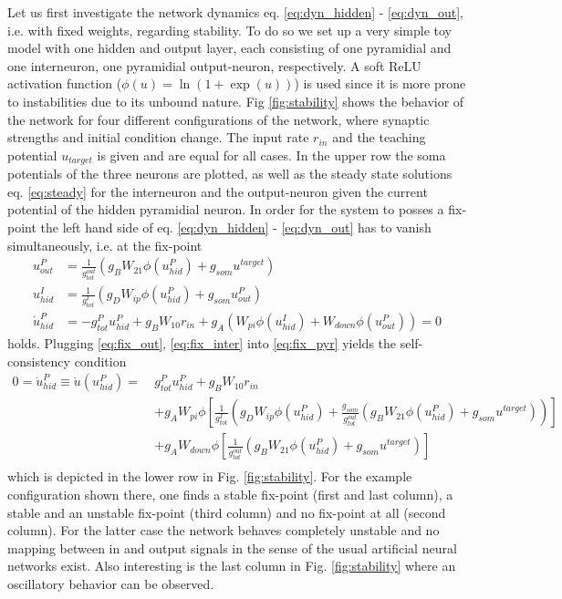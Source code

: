 \documentclass[12pt,a4paper]{article}
\begin{document}
Let us first investigate the network dynamics eq. \eqref{eq:dyn_hidden} - \eqref{eq:dyn_out}, i.e. with fixed weights, regarding stability. To do so we set up a very simple toy model with one hidden and output layer, each consisting of one pyramidial and one interneuron, one pyramidial output-neuron, respectively. A soft ReLU activation function ($\phi(u) = \ln(1 + \exp(u))$) is used since it is more prone to instabilities due to its unbound nature. Fig \ref{fig:stability} shows the behavior of the network for four different configurations of the network, where synaptic strengths and initial condition change. The input rate $r_{in}$ and the teaching potential $u_{target}$ is given and are equal for all cases. In the upper row the soma potentials of the three neurons are plotted, as well as the steady state solutions eq. \eqref{eq:steady} for the interneuron and the output-neuron given the current potential of the hidden pyramidial neuron.
In order for the system to posses a fix-point the left hand side of eq. \eqref{eq:dyn_hidden} - \eqref{eq:dyn_out} has to vanish simultaneously, i.e. at the fix-point
\begin{align}
u^{P}_{out} &= \frac{1}{g^{out}_{tot}}\left( g_B W_{21}\phi(u^P_{hid}) + g_{som}u^{target}\right) \label{eq:fix_out}\\
u^{I}_{hid} &= \frac{1}{g^{I}_{tot}}\left( g_D W_{ip}\phi(u^P_{hid}) + g_{som}u^{P}_{out}\right) \label{eq:fix_inter}\\
\dot{u}^P_{hid} &= -g^{P}_{tot}u^P_{hid} + g_B W_{10}r_{in} + g_A\left(W_{pi}\phi(u^I_{hid}) + W_{down}\phi(u^P_{out})\right) = 0 \label{eq:fix_pyr}
\end{align}
holds. Plugging \eqref{eq:fix_out}, \eqref{eq:fix_inter} into \eqref{eq:fix_pyr} yields the self-consistency condition
\begin{align*}
0 = \dot{u}^P_{hid} \equiv \dot{u}(u^P_{hid}) = ~&g^P_{tot}u^P_{hid} + g_B W_{10}r_{in} \\
&+ g_AW_{pi}\phi\left[\frac{1}{g^I_{tot}}\left( g_D W_{ip}\phi(u^P_{hid}) + \frac{g_{som}}{g^{out}_{tot}}\left( g_B W_{21}\phi(u^P_{hid}) + g_{som}u^{target}\right)\right)\right] \\
&+ g_AW_{down}\phi\left[\frac{1}{g^{out}_{tot}}\left( g_B W_{21}\phi(u^P_{hid}) + g_{som}u^{target}\right)\right]\\
\end{align*}
which is depicted in the lower row in Fig. \ref{fig:stability}. For the example configuration shown there, one finds a stable fix-point (first and last column), a stable and an unstable fix-point (third column) and no fix-point at all (second column). For the latter case the network behaves completely unstable and no mapping between in and output signals in the sense of the usual artificial neural networks exist. Also interesting is the last column in Fig. \ref{fig:stability} where an oscillatory behavior can be observed.
\end{document}
